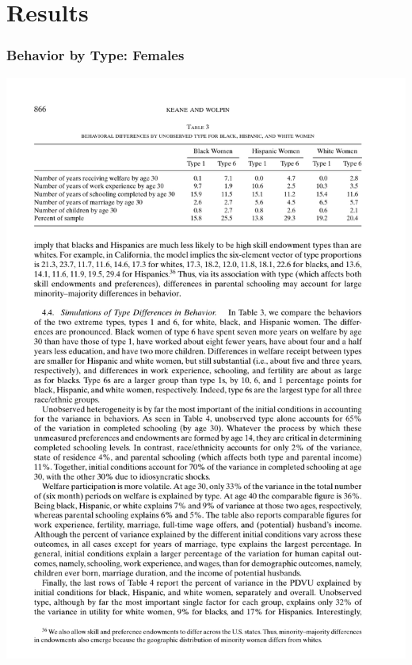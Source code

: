 \section{Results}
\begin{frame}
	\frametitle{Behavior by Type: Females}
	\includegraphics[width=\textwidth]{tab-figs/table3_2010}	
\end{frame}

